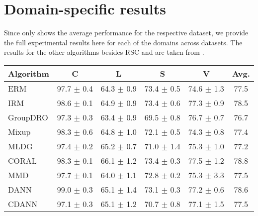 
\chapter{Domain-specific results} %
\label{sec:DomainResults} 

Since  only shows the average performance for the respective dataset, we provide the full experimental results here for each of the domains across datasets. The results for the other algorithms besides \textsc{RSC} and \divcam are taken from \domainbed \cite{huang2020selfchallenging}.

\begin{table*}
\begin{center}
\begin{tabular}{lccccc}
\toprule
\textbf{Algorithm}   & \textbf{C}           & \textbf{L}           & \textbf{S}           & \textbf{V}           & \textbf{Avg.}         \\
\midrule
ERM                  & 97.7 $\pm$ 0.4       & 64.3 $\pm$ 0.9       & 73.4 $\pm$ 0.5       & 74.6 $\pm$ 1.3       & 77.5                 \\
IRM                  & 98.6 $\pm$ 0.1       & 64.9 $\pm$ 0.9       & 73.4 $\pm$ 0.6       & 77.3 $\pm$ 0.9       & 78.5                 \\
GroupDRO             & 97.3 $\pm$ 0.3       & 63.4 $\pm$ 0.9       & 69.5 $\pm$ 0.8       & 76.7 $\pm$ 0.7       & 76.7                 \\
Mixup                & 98.3 $\pm$ 0.6       & 64.8 $\pm$ 1.0       & 72.1 $\pm$ 0.5       & 74.3 $\pm$ 0.8       & 77.4                 \\
MLDG                 & 97.4 $\pm$ 0.2       & 65.2 $\pm$ 0.7       & 71.0 $\pm$ 1.4       & 75.3 $\pm$ 1.0       & 77.2                 \\
CORAL                & 98.3 $\pm$ 0.1       & 66.1 $\pm$ 1.2       & 73.4 $\pm$ 0.3       & 77.5 $\pm$ 1.2       & 78.8                 \\
MMD                  & 97.7 $\pm$ 0.1       & 64.0 $\pm$ 1.1       & 72.8 $\pm$ 0.2       & 75.3 $\pm$ 3.3       & 77.5                 \\
DANN                 & 99.0 $\pm$ 0.3       & 65.1 $\pm$ 1.4       & 73.1 $\pm$ 0.3       & 77.2 $\pm$ 0.6       & 78.6                 \\
CDANN                & 97.1 $\pm$ 0.3       & 65.1 $\pm$ 1.2       & 70.7 $\pm$ 0.8       & 77.1 $\pm$ 1.5       & 77.5                 \\

\end{tabular}
\end{center}
\end{table*}

